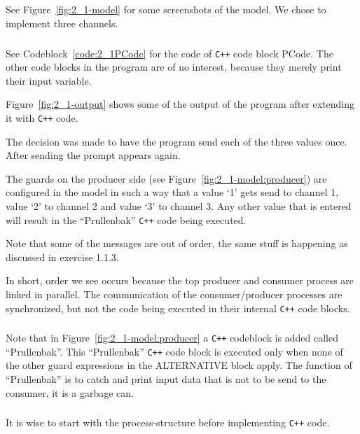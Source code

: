 \documentclass[a4paper,twoside,11pt]{article}
\newcommand{\cpp}{{\tt C++} }
\begin{document}
\FloatBarrier
\subsection{}
\FloatBarrier
\subsubsection{}
See Figure~\ref{fig:2_1-model} for some screenshots of the model.
We chose to implement three channels.

\subsubsection{}
See Codeblock~\ref{code:2_1PCode} for the code of \cpp code block PCode. The other code blocks in the program are of no interest, because they merely print their input variable.
\smallskip

Figure~\ref{fig:2_1-output} shows some of the output of the program after extending it with \cpp code.

The decision was made to have the program send each of the three values once. 
After sending the prompt appears again.

The guards on the producer side (see Figure~\ref{fig:2_1-model:producer}) are configured 
in the model in such a way that a value `1' gets send to channel 1, value `2' to channel 2 and value `3' to channel 3.
Any other value that is entered will result in the ``Prullenbak'' \cpp code being executed.

Note that some of the messages are out of order, the same stuff is happening as discussed in exercise 1.1.3.

In short, order we see occurs because the top producer and consumer process are linked in parallel.
The communication of the consumer/producer processes are synchronized, but not the code being executed in their internal \cpp code blocks.

\subsubsection{}
Note that in Figure~\ref{fig:2_1-model:producer} a \cpp codeblock is added called ``Prullenbak''.
This ``Prullenbak'' \cpp code block is executed only when none of the other guard expressions in the ALTERNATIVE block apply.
The function of ``Prullenbak'' is to catch and print input data that is not to be send to the consumer, it is a garbage can.


\subsubsection{}
It is wise to start with the process-structure before implementing \cpp code.
\end{document}
